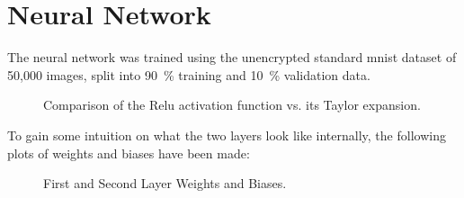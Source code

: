 

\section{Neural Network}
The neural network was trained using the unencrypted standard \gls{mnist} dataset of 50,000 images, split into \SI{90}{\percent} training and \SI{10}{\percent} validation data.

\begin{figure}[H]
  \centering
  \caption[Comparison of the Relu activation function vs. its Taylor expansion]{Comparison of the Relu activation function vs. its Taylor expansion.}
  \label{fig:taylor-relu}
\end{figure}

To gain some intuition on what the two layers look like internally, the following plots of weights and biases have been made:
\begin{figure}[H]
  \centering
  \caption[Weights and biases of our neural network]{First and Second Layer Weights and Biases.}
  \label{fig:layer-1-and-2}
\end{figure}

